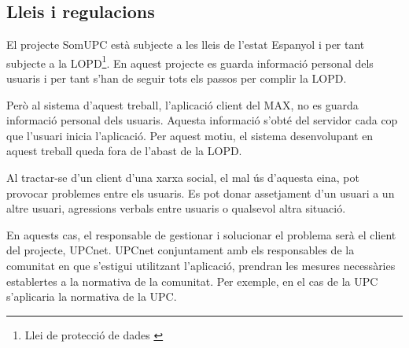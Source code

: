 \subsection{Lleis i regulacions}

El projecte SomUPC està subjecte a les lleis de l'estat Espanyol i per tant subjecte a la LOPD\footnote{Llei de protecció de dades \cite{lopd}}. En aquest projecte es guarda informació personal dels usuaris i per tant s'han de seguir tots els passos per complir la LOPD.

Però al sistema d'aquest treball, l'aplicació client del MAX, no es guarda informació personal dels usuaris. Aquesta informació s'obté del servidor cada cop que l'usuari inicia l'aplicació. Per aquest motiu, el sistema desenvolupant en aquest treball queda fora de l'abast de la LOPD.

Al tractar-se d'un client d'una xarxa social, el mal ús d'aquesta eina, pot provocar problemes entre els usuaris. Es pot donar assetjament d'un usuari a un altre usuari, agressions verbals entre usuaris o qualsevol altra situació. 

En aquests cas, el responsable de gestionar i solucionar el problema serà el client del projecte, UPCnet. UPCnet conjuntament amb els responsables de la comunitat en que s'estigui utilitzant l'aplicació, prendran les mesures necessàries establertes a la normativa de la comunitat. Per exemple, en el cas de la UPC s'aplicaria la normativa de la UPC\cite{normativa_upc}.